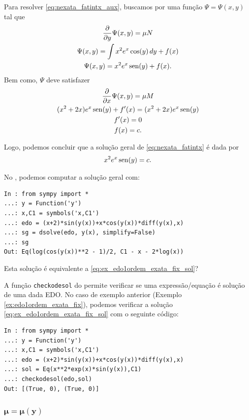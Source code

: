 \begin{ex}
  Para resolver \eqref{eq:nexata_fatintx_aux}, buscamos por uma função $\Psi = \Psi(x,y)$ tal que
  \begin{gather}
    \frac{\partial}{\partial y}\Psi(x,y) = \mu N \\
    \Psi(x,y) = \int x^2e^x\cos(y)\,dy + f(x) \\
    \Psi(x,y) = x^2e^x\operatorname{sen}(y) + f(x).
  \end{gather}
  Bem como, $\Psi$ deve satisfazer
  \begin{gather}
    \frac{\partial}{\partial x}\Psi(x,y) = \mu M \\
    (x^2 + 2x)e^x\operatorname{sen}(y) + f'(x) = (x^2 + 2x)e^x\operatorname{sen}(y) \\
    f'(x) = 0 \\
    f(x) = c.
  \end{gather}

  Logo, podemos concluir que a solução geral de \eqref{eq:nexata_fatintx}  é dada por
  \begin{equation}\label{eq:ex_edo1ordem_exata_fix_sol}
    x^2e^x\operatorname{sen}(y) = c.  
  \end{equation}

  \ifispython
  No \python, podemos computar a solução geral com:
\begin{verbatim}
In : from sympy import *
...: y = Function('y')
...: x,C1 = symbols('x,C1')
...: edo = (x+2)*sin(y(x))+x*cos(y(x))*diff(y(x),x)
...: sg = dsolve(edo, y(x), simplify=False)
...: sg
Out: Eq(log(cos(y(x))**2 - 1)/2, C1 - x - 2*log(x))
\end{verbatim}
  Esta solução é equivalente a \eqref{eq:ex_edo1ordem_exata_fix_sol}?
  \fi
\end{ex}

\ifispython
\begin{obs}
  A função \verb+checkodesol+ do \sympy permite verificar se uma expressão/equação é solução de uma dada EDO. No caso de exemplo anterior (Exemplo \ref{ex:edo1ordem_exata_fix}), podemos verificar a solução \eqref{eq:ex_edo1ordem_exata_fix_sol} com o seguinte código:
\begin{verbatim}
In : from sympy import *
...: y = Function('y')
...: x,C1 = symbols('x,C1')
...: edo = (x+2)*sin(y(x))+x*cos(y(x))*diff(y(x),x)
...: sol = Eq(x**2*exp(x)*sin(y(x)),C1)
...: checkodesol(edo,sol)
Out: [(True, 0), (True, 0)]
\end{verbatim}
\end{obs}
\fi

\subsubsection{$\pmb{\mu = \mu(y)}$}

